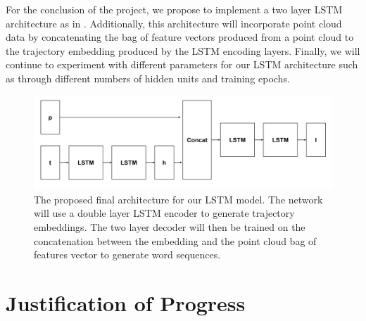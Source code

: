 \documentclass[letterpaper, 12 pt, conference]{ieeeconf}
\begin{document}
For the conclusion of the project, we propose to implement a two layer LSTM architecture as in \cite{Venugopalan_2015_ICCV}. Additionally, this architecture will incorporate point cloud data by concatenating the bag of feature vectors produced from a point cloud to the trajectory embedding produced by the LSTM encoding layers. Finally, we will continue to experiment with different parameters for our LSTM architecture such as through different numbers of hidden units and training epochs. 

\begin{figure}[h]
\centering
\includegraphics[scale=0.15]{Tuple_LSTM}
\caption{The proposed final architecture for our LSTM model. The network will use a double layer LSTM encoder to generate trajectory embeddings. The two layer decoder will then be trained on the concatenation between the embedding and the point cloud bag of features vector to generate word sequences.}
\end{figure}

\section{Justification of Progress}


%


\end{document}
